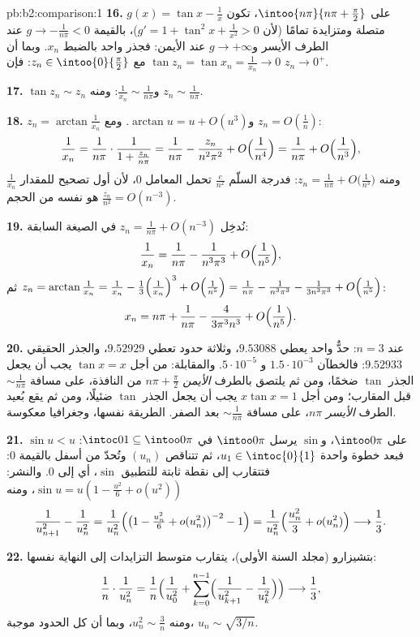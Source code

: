 \begin{solution}{pb:b2:comparison:1}
\textbf{16.} على $\intoo{n\pi}{n\pi + \frac\pi2}$، تكون $g(x) = \tan
x - \frac1x$ متصلة ومتزايدة تمامًا (لأن $g' = 1 +
\tan^2x + \frac1{x^2} > 0$)، بالقيمة $g \to -\frac1{n\pi} < 0$ عند
الطرف الأيسر و$g \to +\infty$ عند الأيمن: فجذر واحد بالضبط
$x_n$. وبما أن $\tan z_n = \tan x_n = \frac1{x_n} \to 0$
مع $z_n \in \intoo{0}{\frac\pi2}$: فإن $z_n \to 0^+$.

\textbf{17.} $\tan z_n \sim z_n$ و$\frac1{x_n} \sim
\frac1{n\pi}$: ومنه $z_n \sim \frac1{n\pi}$.

\textbf{18.} $z_n = \arctan\frac1{x_n}$ و$\arctan u = u +
O(u^3)$. ومع $z_n = O(\frac1n)$:
\[
\frac1{x_n} = \frac{1}{n\pi}\cdot\frac1{1 + \frac{z_n}{n\pi}}
= \frac1{n\pi} - \frac{z_n}{n^2\pi^2} +
O\Bigl(\frac1{n^4}\Bigr)
= \frac1{n\pi} + O\Bigl(\frac1{n^3}\Bigr),
\]
ومنه $z_n = \frac1{n\pi} + O\bigl(\frac1{n^3}\bigr)$: فدرجة
السلّم $\frac{c}{n^2}$ تحمل المعامل $0$، لأن
أول تصحيح للمقدار $\frac1{x_n}$ هو نفسه من الحجم
$\frac{z_n}{n^2} = O(n^{-3})$.

\textbf{19.} نُدخِل $z_n = \frac1{n\pi} + O(n^{-3})$ في
الصيغة السابقة:
\[
\frac{1}{x_n} = \frac{1}{n\pi} - \frac{1}{n^3\pi^3} +
O\Bigl(\frac1{n^5}\Bigr),
\]
ثم $z_n = \arctan\frac1{x_n} = \frac1{x_n} -
\frac{1}{3}\Bigl(\frac1{x_n}\Bigr)^3 + O\Bigl(\frac1{n^5}\Bigr)
= \frac1{n\pi} - \frac{1}{n^3\pi^3} - \frac{1}{3n^3\pi^3} +
O\Bigl(\frac1{n^5}\Bigr)$:
\[
x_n = n\pi + \frac{1}{n\pi} - \frac{4}{3\pi^3n^3} +
O\Bigl(\frac1{n^5}\Bigr).
\]

\textbf{20.} عند $n = 3$: حدٌّ واحد يعطي $9.53088$، وثلاثة حدود تعطي
$9.52929$، والجذر الحقيقي $9.52933$: فالخطآن $1.5\cdot10^{-3}$ و
$5\cdot10^{-5}$. والمقابلة: من أجل $\tan x = x$ يجب أن يجعل الجذر
$\tan$ ضخمًا، ومن ثم يلتصق بالطرف \emph{الأيمن} $n\pi +
\frac\pi2$ من النافذة، على مسافة $\sim\frac1{n\pi}$
قبل المقارب؛ ومن أجل $x\tan x = 1$ يجب أن يجعل الجذر
$\tan$ ضئيلًا، ومن ثم يقع بُعيد الطرف \emph{الأيسر} $n\pi$،
على مسافة $\sim\frac1{n\pi}$ بعد الصفر. الطريقة نفسها،
وجغرافيا معكوسة.

\textbf{21.} $\sin u < u$ على $\intoo0\pi$، و$\sin$ يرسل
$\intoo0\pi$ في $\intoc01 \subseteq \intoo0\pi$: فبعد خطوة
واحدة $u_1 \in \intoc{0}{1}$، ثم تتناقص $(u_n)$ وتُحدّ
من أسفل بالقيمة $0$: فتتقارب إلى نقطة ثابتة للتطبيق $\sin$،
أي إلى $0$. والنشر: $\sin u = u(1 - \frac{u^2}6 +
o(u^2))$، ومنه
\[
\frac{1}{u_{n+1}^2} - \frac1{u_n^2}
= \frac{1}{u_n^2}\Bigl(\bigl(1 - \tfrac{u_n^2}6 +
o(u_n^2)\bigr)^{-2} - 1\Bigr)
= \frac{1}{u_n^2}\Bigl(\frac{u_n^2}{3} + o(u_n^2)\Bigr)
\longrightarrow \frac13 .
\]

\textbf{22.} بتشيزارو (مجلد السنة الأولى)، يتقارب متوسط
التزايدات إلى النهاية نفسها:
\[
\frac{1}{n}\cdot\frac{1}{u_n^2}
= \frac1n\Bigl(\frac1{u_0^2} + \sum_{k=0}^{n-1}
\Bigl(\frac1{u_{k+1}^2} - \frac1{u_k^2}\Bigr)\Bigr)
\longrightarrow \frac13 ,
\]
ومنه $u_n^2 \sim \frac3n$، وبما أن كل الحدود موجبة، $u_n
\sim \sqrt{3/n}$.


\end{solution}
